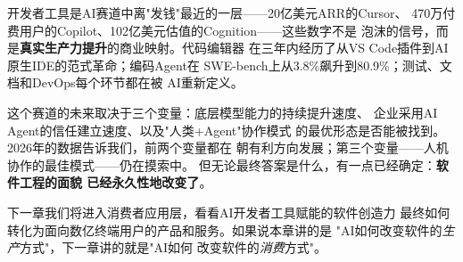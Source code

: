 开发者工具是AI赛道中离"发钱"最近的一层——20亿美元ARR的Cursor、
470万付费用户的Copilot、102亿美元估值的Cognition——这些数字不是
泡沫的信号，而是\textbf{真实生产力提升}的商业映射。代码编辑器
在三年内经历了从VS Code插件到AI原生IDE的范式革命；编码Agent在
SWE-bench上从3.8\%飙升到80.9\%；测试、文档和DevOps每个环节都在被
AI重新定义。

这个赛道的未来取决于三个变量：底层模型能力的持续提升速度、
企业采用AI Agent的信任建立速度、以及"人类+Agent"协作模式
的最优形态是否能被找到。2026年的数据告诉我们，前两个变量都在
朝有利方向发展；第三个变量——人机协作的最佳模式——仍在摸索中。
但无论最终答案是什么，有一点已经确定：\textbf{软件工程的面貌
已经永久性地改变了}。

下一章我们将进入消费者应用层，看看AI开发者工具赋能的软件创造力
最终如何转化为面向数亿终端用户的产品和服务。如果说本章讲的是
"AI如何改变软件的\textit{生产}方式"，下一章讲的就是"AI如何
改变软件的\textit{消费}方式"。
